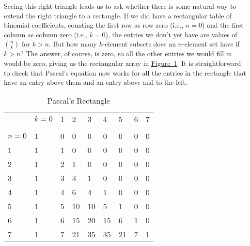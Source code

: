 \documentclass[10pt,]{book}
\theoremstyle{plain}
\theoremstyle{definition}
\numberwithin{equation}{chapter}
\newcommand{\hrulethin}  {\noalign{\hrule height 0.04em}}
\begin{document}
Seeing this right triangle leads us to ask whether there is some natural way to extend the right triangle to a rectangle. If we did have a rectangular table of binomial coefficients, counting the first row as row zero (i.e., \(n=0\)) and the first column as column zero (i.e., \(k=0\)), the entries we don't yet have are values of \(\binom{n}{k}\) for \(k>n\). But how many \(k\)-element subsets does an \(n\)-element set have if \(k>n\)? The answer, of course, is zero, so all the other entries we would fill in would be zero, giving us the rectangular array in \hyperref[Pascal_sRectangle]{Figure~\ref{Pascal_sRectangle}}. It is straightforward to check that Pascal's equation now works for all the entries in the rectangle that have an entry above them and an entry above and to the left.%
\begin{table}
\centering
\begin{tabular}{lllllllll}
&\(k=0\)&1&2&3&4&5&6&7\tabularnewline[0pt]
&&&&&&&&\tabularnewline\hrulethin
\(n=0\)&1&0&0&0&0&0&0&0\tabularnewline[0pt]
1&1&1&0&0&0&0&0&0\tabularnewline[0pt]
2&1&2&1&0&0&0&0&0\tabularnewline[0pt]
3&1&3&3&1&0&0&0&0\tabularnewline[0pt]
4&1&4&6&4&1&0&0&0\tabularnewline[0pt]
5&1&5&10&10&5&1&0&0\tabularnewline[0pt]
6&1&6&15&20&15&6&1&0\tabularnewline[0pt]
7&1&7&21&35&35&21&7&1
\end{tabular}
\caption{Pascal's Rectangle\label{Pascal_sRectangle}}
\end{table}
\end{document}
